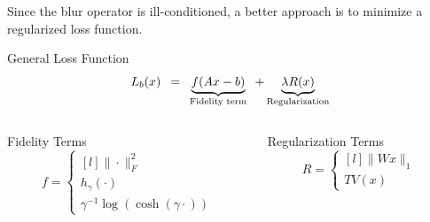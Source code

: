 \documentclass[12pt]{beamer}
\begin{document}
\begin{frame}
Since the blur operator is ill-conditioned, a better approach is to minimize a regularized loss function.
\begin{block}{General Loss Function}
\[ L_b(x) \hspace{0.5em} = \hspace{0.5em} \underbrace{f(Ax-b)}_{\text{Fidelity term}} \hspace{0.5em} + \underbrace{\lambda R(x)}_{\text{Regularization}} \]
\end{block}

\begin{columns}[T]
	\begin{column}{0.45\linewidth}
		\begin{block}{Fidelity Terms} \vspace{-2.5ex}
			\[ f = \left\{ \begin{matrix*}[l] 
			\| \cdot \|_F^2 \\[1ex] h_{\gamma}( \cdot ) \\[1ex] \gamma^{-1} \log(\cosh(\gamma \cdot)) 
			\end{matrix*} \right. \]
		\end{block}
	\end{column}
	\begin{column}{0.45\linewidth}
		\begin{block}{Regularization Terms}
			\[ R = \left\{ \begin{matrix*}[l]
			\| Wx \|_1 \\[1ex] TV(x)
			\end{matrix*} \right. \]
		\end{block}
	\end{column}
\end{columns}
\end{frame}
\end{document}
